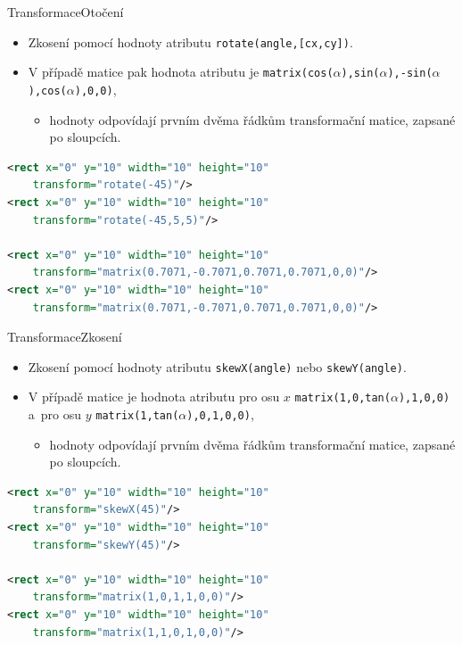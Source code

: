 \begin{frame}[t,fragile]{Transformace}{Otočení}
    \begin{itemize}
        \item Zkosení pomocí hodnoty atributu \texttt{rotate(angle,[cx,cy])}.
        \item V případě matice pak hodnota atributu je \texttt{matrix(cos($\alpha$),sin($\alpha$),-sin($\alpha$),cos($\alpha$),0,0)},
        \begin{itemize}
            \item hodnoty odpovídají prvním dvěma řádkům transformační matice, zapsané po sloupcích. 
        \end{itemize}
    \end{itemize}
    
    \begin{lstlisting}[language=XML,basicstyle={\small\ttfamily}]
<rect x="0" y="10" width="10" height="10" 
    transform="rotate(-45)"/>
<rect x="0" y="10" width="10" height="10" 
    transform="rotate(-45,5,5)"/>

<rect x="0" y="10" width="10" height="10" 
    transform="matrix(0.7071,-0.7071,0.7071,0.7071,0,0)"/>
<rect x="0" y="10" width="10" height="10" 
    transform="matrix(0.7071,-0.7071,0.7071,0.7071,0,0)"/>
    \end{lstlisting}
\end{frame}

\begin{frame}[t,fragile]{Transformace}{Zkosení}
    \begin{itemize}
        \item Zkosení pomocí hodnoty atributu \texttt{skewX(angle)} nebo \texttt{skewY(angle)}.
        \item V případě matice je hodnota atributu pro osu $x$ \texttt{matrix(1,0,tan($\alpha$),1,0,0)}\\
              a~pro osu $y$ \texttt{matrix(1,tan($\alpha$),0,1,0,0)},
        \begin{itemize}
            \item hodnoty odpovídají prvním dvěma řádkům transformační matice, zapsané po sloupcích. 
        \end{itemize}
    \end{itemize}
    
    \begin{lstlisting}[language=XML,basicstyle={\small\ttfamily}]
<rect x="0" y="10" width="10" height="10" 
    transform="skewX(45)"/>
<rect x="0" y="10" width="10" height="10" 
    transform="skewY(45)"/>

<rect x="0" y="10" width="10" height="10" 
    transform="matrix(1,0,1,1,0,0)"/>
<rect x="0" y="10" width="10" height="10" 
    transform="matrix(1,1,0,1,0,0)"/>
    \end{lstlisting}
\end{frame}